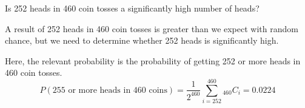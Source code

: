 \documentclass{beamer}
\newcommand{\prob}[1]{P\left(#1\right)}
\newcommand{\comb}[2]{{_{#1}C_{#2}}}
\begin{document}
\begin{frame}
\begin{example}
Is 252 heads in 460 coin tosses a significantly high number of heads?\pause

\vspace{1mm}
A result of 252 heads in 460 coin tosses is greater than we expect with random chance, but we need to determine whether 252 heads is significantly high.\pause

\vspace{1mm}
Here, the relevant probability is the probability of getting 252 or more heads in 460 coin tosses.
\vspace{-4mm}
\begin{equation*}
\prob{\text{255 or more heads in 460 coins}}=\dfrac{1}{2^{460}}\sum_{i=252}^{460} \comb{460}{i} = 0.0224
\end{equation*}\pause


\end{example}
\end{frame}
\end{document}
